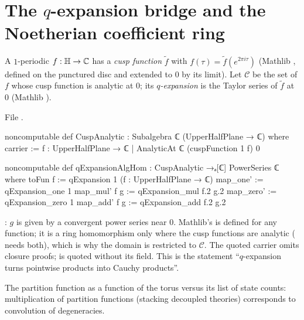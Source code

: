 \section{The \texorpdfstring{$q$}{q}-expansion bridge and the Noetherian coefficient ring}\label{l14:sec:qexp}

\begin{definition}\label{l14:def:cuspAnalytic}
A $1$-periodic $f:\mathbb{H}\to{\mathbb{C}}$ has a \emph{cusp function} $\tilde f$ with $f(\tau) = \tilde f(e^{2\pi i\tau})$ (Mathlib
, defined on the punctured disc and extended to $0$ by its limit). Let $\mathcal C$ be the set of $f$
whose cusp function is analytic at $0$; its \emph{$q$-expansion} is the Taylor series of $\tilde f$ at $0$ (Mathlib
).
\end{definition}
\noindent File .
\begin{leancode}
noncomputable def CuspAnalytic : Subalgebra ℂ (UpperHalfPlane → ℂ) where
  carrier := {f : UpperHalfPlane → ℂ | AnalyticAt ℂ (cuspFunction 1 f) 0}

noncomputable def qExpansionAlgHom : CuspAnalytic →ₐ[ℂ] PowerSeries ℂ where
  toFun f := qExpansion 1 (f : UpperHalfPlane → ℂ)
  map_one' := qExpansion_one 1
  map_mul' f g := qExpansion_mul f.2 g.2
  map_zero' := qExpansion_zero 1
  map_add' f g := qExpansion_add f.2 g.2
\end{leancode}
\begin{dictionary}
: $g$ is given by a convergent power series near $0$. Mathlib's  is defined for any
function; it is a ring homomorphism only where the cusp functions are analytic ( needs both), which is why
the domain is restricted to $\mathcal C$. The quoted carrier omits closure proofs;  is quoted without
its  field. This is the statement ``$q$-expansion turns pointwise products into Cauchy products''.
\end{dictionary}
\begin{physics}
The partition function as a function of the torus versus its list of state counts: multiplication of partition functions
(stacking decoupled theories) corresponds to convolution of degeneracies.
\end{physics}

